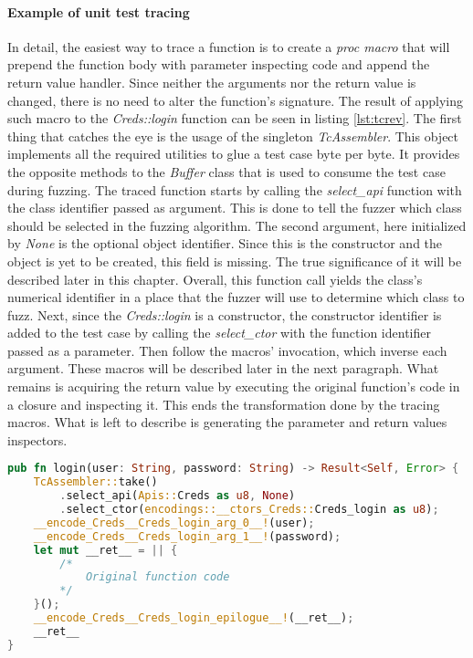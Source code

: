 \paragraph{Example of unit test tracing}
In detail, the easiest way to trace a function is to create a \textit{proc macro} that will prepend the function body with parameter inspecting code and append the return value handler. Since neither the arguments nor the return value is changed, there is no need to alter the function's signature. The result of applying such macro to the \textit{Creds::login} function can be seen in listing \ref{lst:tcrev}. The first thing that catches the eye is the usage of the singleton \textit{TcAssembler}. This object implements all the required utilities to glue a test case byte per byte. It provides the opposite methods to the \textit{Buffer} class that is used to consume the test case during fuzzing. The traced function starts by calling the \textit{select\_api} function with the class identifier passed as argument. This is done to tell the fuzzer which class should be selected in the fuzzing algorithm. The second argument, here initialized by \textit{None} is the optional object identifier. Since this is the constructor and the object is yet to be created, this field is missing. The true significance of it will be described later in this chapter. Overall, this function call yields the class's numerical identifier in a place that the fuzzer will use to determine which class to fuzz. Next, since the \textit{Creds::login} is a constructor, the constructor identifier is added to the test case by calling the \textit{select\_ctor} with the function identifier passed as a parameter. Then follow the macros' invocation, which inverse each argument. These macros will be described later in the next paragraph. What remains is acquiring the return value by executing the original function's code in a closure and inspecting it. This ends the transformation done by the tracing macros. What is left to describe is generating the parameter and return values inspectors.

\begin{minipage}{\linewidth}
\begin{lstlisting}[language=rust,caption={Example testcase reversing code.},label={lst:tcrev}]
pub fn login(user: String, password: String) -> Result<Self, Error> {
    TcAssembler::take()
        .select_api(Apis::Creds as u8, None)
        .select_ctor(encodings::__ctors_Creds::Creds_login as u8);
    __encode_Creds__Creds_login_arg_0__!(user);
    __encode_Creds__Creds_login_arg_1__!(password);
    let mut __ret__ = || {
        /*
            Original function code
        */
    }();
    __encode_Creds__Creds_login_epilogue__!(__ret__);
    __ret__
}
\end{lstlisting}
\end{minipage}



